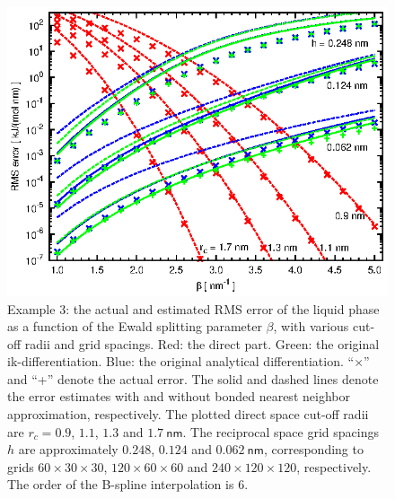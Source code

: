 \documentclass[journal=jacsat,manuscript=article]{achemso}
\begin{document}
\begin{figure}
  \centering
  \includegraphics[]{fig.mesh.ik.ana.eps}
  \caption{Example 3: the actual and estimated RMS error of the liquid
    phase as a function of the Ewald splitting parameter $\beta$,
    with various cut-off radii and grid spacings.
    Red: the direct part. Green: the original ik-differentiation.
    Blue: the original analytical differentiation. ``$\times$'' and
    ``+'' denote the actual error.  The solid and dashed lines denote
    the error estimates with and without bonded nearest neighbor
    approximation, respectively. The plotted direct space cut-off radii are
    $r_c = 0.9$, $1.1$, $1.3$ and  $1.7\:\textsf{nm}$. The
    reciprocal space grid spacings $h$  are approximately
    $0.248$, $0.124$ and $0.062\:\textsf{nm}$, corresponding to
    grids $60\times 30\times 30$, $120\times 60\times 60$ and
    $240\times 120\times 120$, respectively. The order of the B-spline
    interpolation is 6.
  }
  \label{fig:tmp-add1}
\end{figure}
\end{document}
